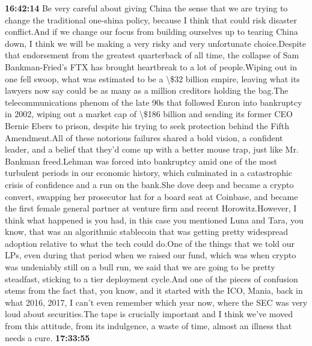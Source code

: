 \documentclass{article}%
\begin{document}
\textbf{16:42:14}%
\newline%
Be very careful about giving China the sense that we are trying to change the traditional one{-}shina policy, because I think that could risk disaster conflict.And if we change our focus from building ourselves up to tearing China down, I think we will be making a very risky and very unfortunate choice.Despite that endorsement from the greatest quarterback of all time, the collapse of Sam Bankman{-}Fried's FTX has brought heartbreak to a lot of people.Wiping out in one fell swoop, what was estimated to be a \textbackslash{}\$32 billion empire, leaving what its lawyers now say could be as many as a million creditors holding the bag.The telecommunications phenom of the late 90s that followed Enron into bankruptcy in 2002, wiping out a market cap of \textbackslash{}\$186 billion and sending its former CEO Bernie Ebers to prison, despite his trying to seek protection behind the Fifth Amendment.All of these notorious failures shared a bold vision, a confident leader, and a belief that they'd come up with a better mouse trap, just like Mr. Bankman freed.Lehman was forced into bankruptcy amid one of the most turbulent periods in our economic history, which culminated in a catastrophic crisis of confidence and a run on the bank.She dove deep and became a crypto convert, swapping her prosecutor hat for a board seat at Coinbase, and became the first female general partner at venture firm and recent Horowitz.However, I think what happened is you had, in this case you mentioned Luna and Tara, you know, that was an algorithmic stablecoin that was getting pretty widespread adoption relative to what the tech could do.One of the things that we told our LPs, even during that period when we raised our fund, which was when crypto was undeniably still on a bull run, we said that we are going to be pretty steadfast, sticking to a tier deployment cycle.And one of the pieces of confusion stems from the fact that, you know, and it started with the ICO, Mania, back in what 2016, 2017, I can't even remember which year now, where the SEC was very loud about securities.The tape is crucially important and I think we've moved from this attitude, from its indulgence, a waste of time, almost an illness that needs a cure.%
\textbf{17:33:55}%
\newline%
\end{document}
